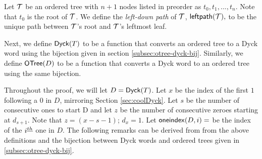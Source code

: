 Let $\mathcal{T}$ be an ordered tree with $n+1$ nodes listed in preorder as $t_0,t_1,...,t_n$.  Note that $t_0$ is the root of $\mathcal{T}$. We define the \emph{left-down path} of $\mathcal{T}$, $\mathsf{leftpath}{(\mathcal{\mathcal{T}})},$ to be the unique path between $\mathcal{T}$'s root and $\mathcal{T}$'s leftmost leaf.

Next, we define $\mathsf{Dyck}{(T)}$ to be a function that converts an ordered tree to a Dyck word using the bijection given in section \ref{subsec:otree-dyck-bij}.  Similarly, we define $\mathsf{OTree}{(D)}$ to be a function that converts a Dyck word to an ordered tree using the same bijection.  

Throughout the proof, we will let $D=\mathsf{Dyck}{(T)}$.  Let $x$ be the index of the first $1$ following a $0$ in $D$, mirroring Section \ref{sec:coolDyck}.  Let $s$ be the number of consecutive ones to start D and let $z$ be the number of consecutive zeroes starting at $d_{s+1}$.  Note that $z=(x-s-1)$; $d_{x}=1$.  Let $\mathsf{oneindex}({D}, i)=$ be the index of the $i^{\underline{th}}{}$ one in $D$.
The following remarks can be derived from from the above definitions and the bijection between Dyck words and ordered trees given in \ref{subsec:otree-dyck-bij}.


